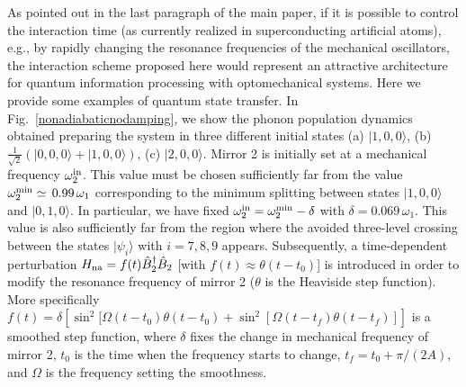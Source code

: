 \documentclass[aps,pra,twocolumn,floatfix,longbibliography, superscriptaddress]{revtex4-1}
\newcommand{\ket}[1]{|#1\rangle}
\newcommand{\figref}[1]{\mbox{Fig.~\ref{#1}}}
\begin{document}
As pointed out in the last paragraph of the main paper, if it is possible to control the interaction time (as currently realized in superconducting artificial atoms), e.g., by rapidly changing  the resonance frequencies of the mechanical oscillators, the interaction scheme  proposed here would represent an attractive architecture for quantum information processing with optomechanical systems. Here we provide some examples of quantum state transfer.
In  \figref{nonadiabaticnodamping}, we show the phonon population dynamics obtained preparing the system in three different initial  states
(a) $\ket{1,0,0}$, (b) $\frac{1}{\sqrt{2}}(\ket{0,0,0}+\ket{1,0,0})$, (c) $\ket{2,0,0}$.
Mirror 2 is initially  set at a mechanical frequency $\omega^{\rm in}_2$. This value must be chosen sufficiently far from the value $\omega_2^{\rm min}\simeq \, 0.99\, \omega_1$ corresponding to the minimum splitting between states $\ket{1,0,0}$ and $\ket{0,1,0}$.
In particular, we have fixed   $\omega^{\rm in}_2=\omega_2^{\rm min}- \delta $ with $\delta=0.069\, \omega_1 $. This value is also sufficiently far from the region where the avoided three-level crossing between the states $\ket{\psi_i}$ with $i=7,8,9$ appears. Subsequently, a time-dependent perturbation $H_{\rm na}= f(t) \hat B_2^{\dag}\hat B_2$ [with $f(t)\approx \theta(t-t_0)$]   is introduced in order to modify the resonance frequency of mirror 2 ($\theta$ is the Heaviside step function). More specifically 
$
f(t)=\delta\left[\sin^2[\Omega(t-t_0)\theta(t-t_0)+\sin^2[\Omega(t-t_f)\theta(t-t_f)]\right]
$ is a smoothed step function, where $\delta$ fixes the change in  mechanical frequency of mirror 2, $t_0$ is the time when the frequency starts to change, $t_f= t_0+\pi/(2A)$, and $\Omega$ is the frequency setting the smoothness.
\end{document}
